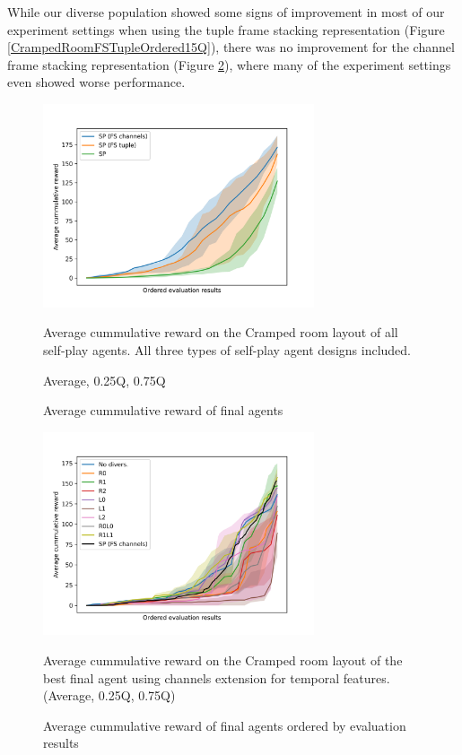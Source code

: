 While our diverse population showed some signs of improvement in most of our experiment settings when using the tuple frame stacking representation (Figure \ref{CrampedRoomFSTupleOrdered15Q}), there was no improvement for the channel frame stacking representation (Figure \ref{CrampedRoomFSChannelsOrdered15Q}), where many of the experiment settings even showed worse performance.

\begin{figure}[!ht]
    \centering
    \includegraphics*[width=8cm]{../img/CrampedRoomFSVariantsOrderedAvg.png}

    \caption{Average cummulative reward of final agents}
    \label{CrampedRoomFSVariantsOrderedAvg}
    \medskip
    \small 
    Average cummulative reward on the Cramped room layout of all self-play agents.
    All three types of self-play agent designs included.

    Average, 0.25Q, 0.75Q

\end{figure}


\begin{figure}[!ht]
    \centering
    \includegraphics*[width=8cm]{../img/CrampedRoomFSChannelsOrdered15Q.png}

    \caption{Average cummulative reward of final agents ordered by evaluation results}
    \label{CrampedRoomFSChannelsOrdered15Q}
    \medskip
    \small 
    Average cummulative reward on the Cramped room layout of the best final agent using channels extension for temporal features.    
    (Average, 0.25Q, 0.75Q)

\end{figure}

